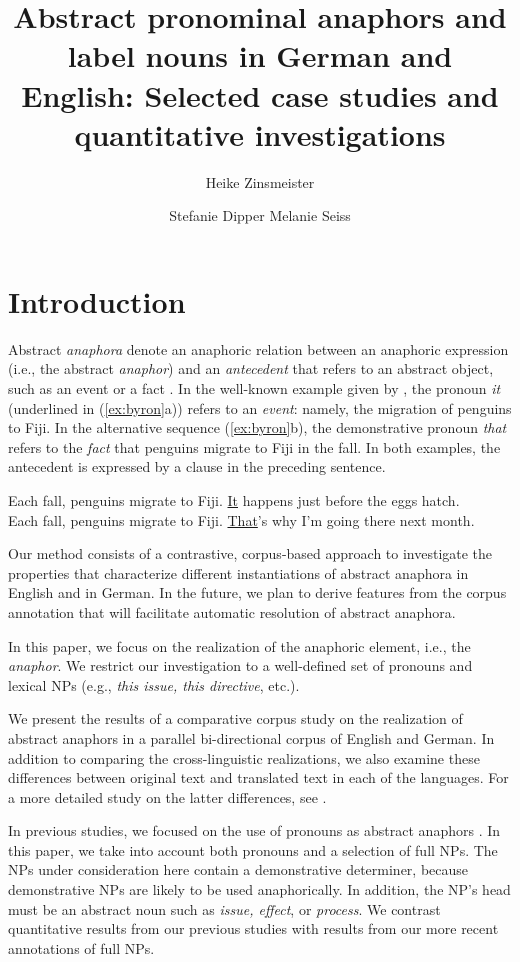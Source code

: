 \documentclass[output=paper]{LSP/langsci}
\title{Abstract pronominal anaphors and label nouns in German and English: Selected case studies and quantitative investigations}
\author{
Heike Zinsmeister\affiliation{University of Stuttgart}\and
Stefanie Dipper\affiliation{Ruhr-University Bochum}\lastand
Melanie Seiss\affiliation{University of Konstanz}
}
\begin{document}
\section{Introduction}
\label{zinsmeister:sec:intro}
Abstract \textit{anaphora} denote an anaphoric relation between an anaphoric expression (i.e., the abstract \textit{anaphor}) and an \textit{antecedent} that refers to an abstract object, such as an event or a fact \citep{Asher1993}.  In the well-known example given by \cite{Byron2002}, the pronoun {\em it} (underlined in (\ref{ex:byron}a)) refers to an {\it event}: namely, the migration of penguins to Fiji. In the alternative sequence (\ref{ex:byron}b), the demonstrative pronoun {\em that} refers to the \emph{fact} that penguins migrate to Fiji in the fall. In both examples, the antecedent is expressed by a clause in the preceding sentence.

\ea\label{ex:byron} \ea Each fall, penguins migrate to Fiji. \ul{It} happens just before the eggs hatch.\\
\ex Each fall, penguins migrate to Fiji. \ul{That}'s why I'm going there next month.
\z \z

Our method consists of a contrastive, corpus-based approach to investigate the properties that characterize different instantiations of abstract anaphora in English and in German.  In the future, we plan to derive features from the corpus annotation that will facilitate automatic resolution of abstract anaphora. 

In this paper, we focus on the realization of the anaphoric element, i.e., the \emph{anaphor}. We restrict our investigation to a well-defined set of pronouns and lexical NPs (e.g., {\em this issue, this directive}, etc.).
 
We present the results of a comparative corpus study on the realization of abstract anaphors in a parallel bi-directional corpus of  English and German. In addition to comparing the cross-linguistic realizations, we also examine these differences between original text and translated text in each of the languages. For a more detailed study on the latter differences, see  \citet{Dipper2012}.

In previous studies, we focused on the use of pronouns as abstract anaphors \citep{dipper-etal-daarc11,law09}.
In this paper, we take into account both pronouns and a selection of full NPs. The NPs under consideration here contain a demonstrative determiner, because demonstrative NPs are likely to be used anaphorically. In addition, the NP's head must be an abstract noun such as \textit{issue, effect}, or \textit{process}. We contrast quantitative results from our previous studies with results from our more recent annotations of full NPs. 
\end{document}
